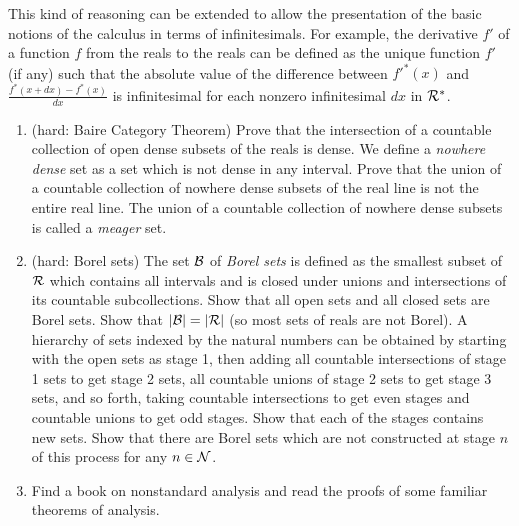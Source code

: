 This kind of reasoning can be extended to allow the presentation of
the basic notions of the calculus in terms of
infinitesimals.  For 
example, the derivative $f'$ of a function $f$ from the reals
to the reals can be defined as the unique function $f'$ (if any) such that 
the absolute value of the difference between $f'^*(x)$ and
$\displaystyle\frac{f^*(x+dx)-f^*(x)}{dx}$ is
infinitesimal for each
nonzero infinitesimal $dx$ in ${\cal R}^*$.

\newpage

\Exercises

\begin{enumerate}
 \item (hard:  Baire Category Theorem)  Prove
   that the intersection of a
   countable collection of open dense
   subsets of the reals is
   dense.  We define a {\itshape nowhere dense\/} set as a set which is not
   dense in any interval.  Prove that the union of a countable collection of
   nowhere dense subsets of the real line is not the entire real line. The union of a
   countable collection of nowhere dense subsets is called a {\itshape
   meager\/} set.

 \item (hard:  Borel sets)  The set $\cal B$ of {\itshape
   Borel sets\/} is defined as the smallest subset of ${\cal R}$ which contains
   all intervals and is closed under unions and
   intersections of its countable subcollections.  Show
   that all open sets and all closed sets are Borel sets.  Show that $|{\cal
   B}| = |{\cal R}|$ (so most sets of reals are not Borel).  A hierarchy of
   sets indexed by the natural numbers can be obtained by
   starting with the open sets as stage 1, then adding all countable
   intersections of stage 1 sets to get stage 2 sets, all countable unions of
   stage 2 sets to get stage 3 sets, and so forth, taking countable
   intersections to get even stages and countable unions to get odd stages.
   Show that each of the stages contains new sets.  Show that there are Borel
   sets which are not constructed at stage $n$ of this process for any $n \in
   {\cal N}$.  

 \item  Find a book on nonstandard analysis and read the proofs of some
   familiar theorems of analysis.
\end{enumerate}
